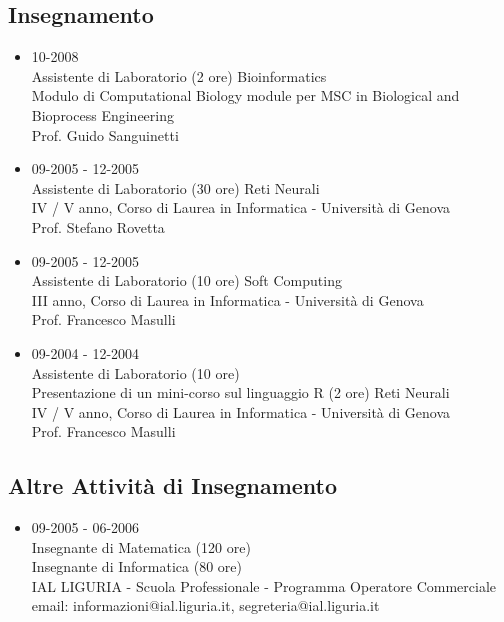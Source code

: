 \documentclass[a4paper,10pt]{article}
\begin{document}
\subsection*{Insegnamento}
\begin{itemize}
\item 10-2008 \\
  Assistente di Laboratorio (2 ore)
  Bioinformatics \\
  Modulo di Computational Biology module per MSC in Biological and Bioprocess Engineering \\
  Prof. Guido Sanguinetti \\
\item 09-2005 - 12-2005 \\
  Assistente di Laboratorio (30 ore)
  Reti Neurali \\
  IV / V anno, Corso di Laurea in Informatica - Universit\`a di Genova \\
  Prof. Stefano Rovetta \\
\item 09-2005 - 12-2005 \\
  Assistente di Laboratorio (10 ore)
  Soft Computing \\
  III anno, Corso di Laurea in Informatica - Universit\`a di Genova \\
  Prof. Francesco Masulli \\
\item 09-2004 - 12-2004 \\
  Assistente di Laboratorio (10 ore) \\
  Presentazione di un mini-corso sul linguaggio R (2 ore)
  Reti Neurali \\
  IV / V anno, Corso di Laurea in Informatica - Universit\`a di Genova \\
  Prof. Francesco Masulli \\
\end{itemize}

\subsection*{Altre Attivit\`a di Insegnamento}
\begin{itemize}
\item 09-2005 - 06-2006 \\
  Insegnante di Matematica (120 ore) \\
  Insegnante di Informatica (80 ore) \\  
  IAL LIGURIA - Scuola Professionale - Programma Operatore Commerciale \\
  email: informazioni@ial.liguria.it, segreteria@ial.liguria.it
\end{itemize}
\end{document}
